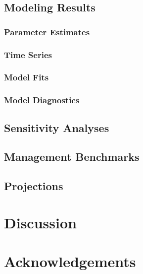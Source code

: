 \documentclass[
  letterpaper,
]{article}
\begin{document}
\newpage{}

\subsection{Modeling Results}\label{sec-assmt-results}

\subsubsection{Parameter Estimates}\label{parameter-estimates}

\subsubsection{Time Series}\label{time-series}

\subsubsection{Model Fits}\label{model-fits}

\subsubsection{Model Diagnostics}\label{model-diagnostics}

\newpage{}

\subsection{Sensitivity Analyses}\label{sec-assmt-sens}

\newpage{}

\subsection{Management Benchmarks}\label{sec-assmt-bench}

\newpage{}

\subsection{Projections}\label{sec-assmt-proj}

\newpage{}

\section{Discussion}\label{sec-discussion}

\newpage{}

\section{Acknowledgements}\label{sec-acknowledgements}
\end{document}
